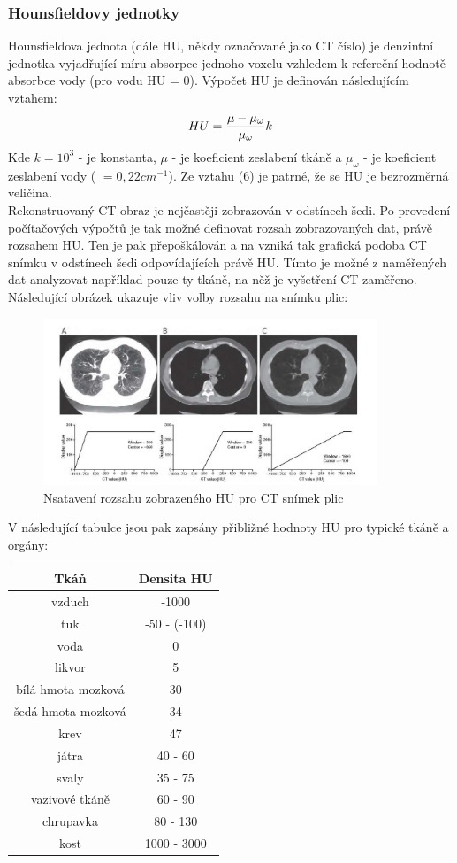 \documentclass{thesis}%
\begin{document}
\subsubsection{Hounsfieldovy jednotky}
Hounsfieldova jednota (dále HU, někdy označované jako CT číslo) je denzintní jednotka vyjadřující míru absorpce jednoho voxelu vzhledem k refereční hodnotě absorbce vody (pro vodu HU = 0). Výpočet HU je definován následujícím vztahem:
\begin{equation}
 \centering
	HU = \frac{\mu -  \mu_{\omega}}{\mu_{\omega}}k
\end{equation}
Kde $k=10^3$ - je konstanta, $\mu$ - je koeficient zeslabení tkáně a $\mu_{\omega}$ - je koeficient zeslabení vody ( $ = 0,22cm^{-1}$). Ze vztahu (6) je patrné, že se HU je bezrozměrná veličina.\\
Rekonstruovaný CT obraz je nejčastěji zobrazován v odstínech šedi. Po provedení počítačových výpočtů je tak možné definovat rozsah zobrazovaných dat, právě rozsahem HU. Ten je pak přepoškálován a na vzniká tak grafická podoba CT snímku v odstínech šedi odpovídajících právě HU. Tímto je možné z naměřených dat analyzovat například pouze ty tkáně, na něž je vyšetření CT zaměřeno. Následující obrázek ukazuje vliv volby rozsahu na snímku plic:
\begin{figure}[ht!]
 \centering
	\includegraphics[width=10cm]{ruzna_HU.jpg}
	\caption[Nastavení rozsahu HU]{Nsatavení rozsahu zobrazeného HU pro CT snímek plic}
\end{figure}
V následující tabulce jsou pak zapsány přibližné hodnoty HU pro typické tkáně a orgány:
\begin{tabular}{c|c}
 \centering
\bfseries \bfseries Tkáň & \bfseries Densita HU\\
\hline \hline
vzduch                      & -1000\\
tuk                            & -50 - (-100)\\
voda                         & 0\\
likvor                         & 5\\
bílá hmota mozková  & 30\\
šedá hmota mozková& 34\\
krev                           & 47\\
játra                          & 40 - 60\\
svaly                         & 35 - 75\\
vazivové tkáně         & 60 - 90\\
chrupavka                 & 80 - 130 \\
kost                           & 1000 - 3000 
\end{tabular}
\end{document}
